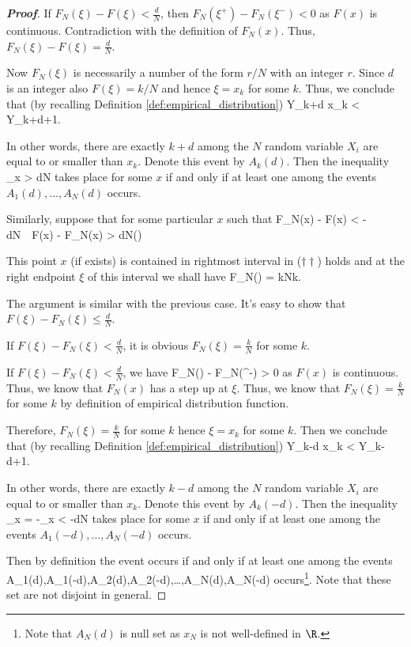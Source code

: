 \begin{proof}[\bf Proof]
If $F_N(\xi) - F(\xi) < \frac dN$, then $F_N(\xi^+) - F_N(\xi^-) < 0$ as $F(x)$ is continuous. Contradiction with the definition of $F_N(x)$. Thus, $F_N(\xi) - F(\xi) = \frac dN$.


Now $F_N(\xi)$ is necessarily a number of the form $r/N$ with an integer $r$. Since $d$ is an integer also $F(\xi) = k/N$ and hence $\xi = x_k$ for some $k$. Thus, we conclude that (by recalling Definition \ref{def:empirical_distribution})
\be
Y_{k+d} \leq x_k < Y_{k+d+1}.
\ee

In other words, there are exactly $k+d$ among the $N$ random variable $X_i$ are equal to or smaller than $x_k$. Denote this event by $A_k(d)$. Then the inequality
\be
\sup_x  > \frac dN
\ee
takes place for some $x$ if and only if at least one among the events $A_1(d),\dots,A_N(d)$ occurs.

Similarly, suppose that for some particular $x$ such that
\be
F_N(x) - F(x) < -\frac dN\ \ra\ F(x) - F_N(x) > \frac dN\qquad (\dag\dag)
\ee

This point $x$ (if exists) is contained in rightmost interval in ($\dag\dag$) holds and at the right endpoint $\xi$ of this interval we shall have
\be
F_N(\xi) = \frac kN\qquad {}k.
\ee

The argument is similar with the previous case. It's easy to show that $F(\xi) - F_N(\xi) \leq \frac dN$.

If $F(\xi) - F_N(\xi) < \frac dN$, it is obvious $F_N(\xi) = \frac kN$ for some $k$.

If $F(\xi) - F_N(\xi) < \frac dN$, we have
\be
F_N(\xi) - F_N(\xi^-) > 0
\ee
as $F(x)$ is continuous. Thus, we know that $F_N(x)$ has a step up at $\xi$. Thus, we know that $F_N(\xi) = \frac kN$ for some $k$ by definition of empirical distribution function.

Therefore, $F_N(\xi) = \frac kN$ for some $k$ hence $\xi = x_k$ for some $k$. Then we conclude that (by recalling Definition \ref{def:empirical_distribution})
\be
Y_{k-d} \leq x_k < Y_{k-d+1}.
\ee

In other words, there are exactly $k-d$ among the $N$ random variable $X_i$ are equal to or smaller than $x_k$. Denote this event by $A_k(-d)$. Then the inequality
\be
\inf_x  = -\sup_x  < -\frac dN
\ee
takes place for some $x$ if and only if at least one among the events $A_1(-d),\dots,A_N(-d)$ occurs.

Then by definition the event
\be
{}
\ee
occurs if and only if at least one among the events
\be
A_1(d),A_1(-d),A_2(d),A_2(-d),\dots,A_N(d),A_N(-d)
\ee
occurs\footnote{Note that $A_N(d)$ is null set as $x_N$ is not well-defined in $\R$.}. Note that these set are not disjoint in general.


\end{proof}
